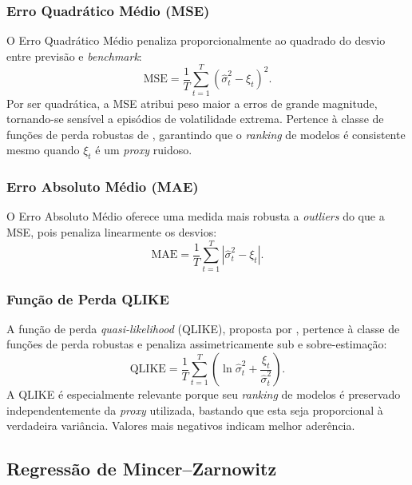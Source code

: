 \subsubsection{Erro Quadrático Médio (MSE)}

O Erro Quadrático Médio penaliza proporcionalmente ao quadrado do desvio
entre previsão e \emph{benchmark}:
%
\begin{equation}
    \label{eq:mse}
    \text{MSE} = \frac{1}{T}
    \sum_{t=1}^{T}
    \left(\hat{\sigma}_t^2 - \xi_t\right)^2.
\end{equation}
%
Por ser quadrática, a MSE atribui peso maior a erros de grande magnitude,
tornando-se sensível a episódios de volatilidade extrema. Pertence à classe
de funções de perda robustas de , garantindo que o
\emph{ranking} de modelos é consistente mesmo quando $\xi_t$ é um
\emph{proxy} ruidoso.

\subsubsection{Erro Absoluto Médio (MAE)}

O Erro Absoluto Médio oferece uma medida mais robusta a \emph{outliers} do
que a MSE, pois penaliza linearmente os desvios:
%
\begin{equation}
    \label{eq:mae}
    \text{MAE} = \frac{1}{T}
    \sum_{t=1}^{T}
    \left|\hat{\sigma}_t^2 - \xi_t\right|.
\end{equation}

\subsubsection{Função de Perda QLIKE}

A função de perda \emph{quasi-likelihood} (QLIKE), proposta por
, pertence à classe de funções de perda robustas e
penaliza assimetricamente sub e sobre-estimação:
%
\begin{equation}
    \label{eq:qlike}
    \text{QLIKE} = \frac{1}{T}
    \sum_{t=1}^{T}
    \left(\ln\hat{\sigma}_t^2 +
    \frac{\xi_t}{\hat{\sigma}_t^2}\right).
\end{equation}
%
A QLIKE é especialmente relevante porque seu \emph{ranking} de modelos é
preservado independentemente da \emph{proxy} utilizada, bastando que esta
seja proporcional à verdadeira variância. Valores mais negativos indicam
melhor aderência.

\subsection{Regressão de Mincer--Zarnowitz}
\label{subsec:mincer_zarnowitz}

